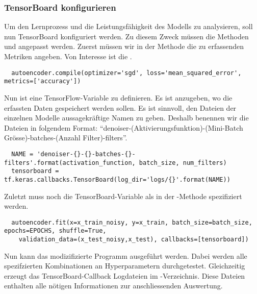\subsubsection{TensorBoard konfigurieren}
Um den Lernprozess und die Leistungsfähigkeit des Modells zu analysieren,
soll nun TensorBoard konfiguriert werden.
Zu diesem Zweck müssen die Methoden  und  angepasst werden.
Zuerst müssen wir in der  Methode die zu erfassenden Metriken
angeben. Von Interesse ist die .
\begin{verbatim}
  autoencoder.compile(optimizer='sgd', loss='mean_squared_error', metrics=['accuracy'])
\end{verbatim}
Nun ist eine TensorFlow-Variable zu definieren. Es ist anzugeben, wo
die erfassten Daten gespeichert werden sollen. Es ist sinnvoll, den Dateien
der einzelnen Modelle aussagekräftige Namen zu geben. Deshalb benennen wir die
Dateien in folgendem Format: ``denoiser-(Aktivierungsfunktion)-(Mini-Batch
Grösse)-batches-(Anzahl Filter)-filters''.
\begin{verbatim}
  NAME = 'denoiser-{}-{}-batches-{}-filters'.format(activation_function, batch_size, num_filters)
  tensorboard = tf.keras.callbacks.TensorBoard(log_dir='logs/{}'.format(NAME))
\end{verbatim}
Zuletzt muss noch die TensorBoard-Variable als  in der
-Methode spezifiziert werden.
\begin{verbatim}
  autoencoder.fit(x=x_train_noisy, y=x_train, batch_size=batch_size, epochs=EPOCHS, shuffle=True,
    validation_data=(x_test_noisy,x_test), callbacks=[tensorboard])
\end{verbatim}
Nun kann das modizifizierte Programm ausgeführt werden. Dabei werden alle
spezifzierten Kombinationen an Hyperparametern durchgetestet. Gleichzeitig
erzeugt das TensorBoard-Callback Logdateien im -Verzeichnis. Diese
Dateien enthalten alle nötigen Informationen zur anschliessenden Auswertung.

